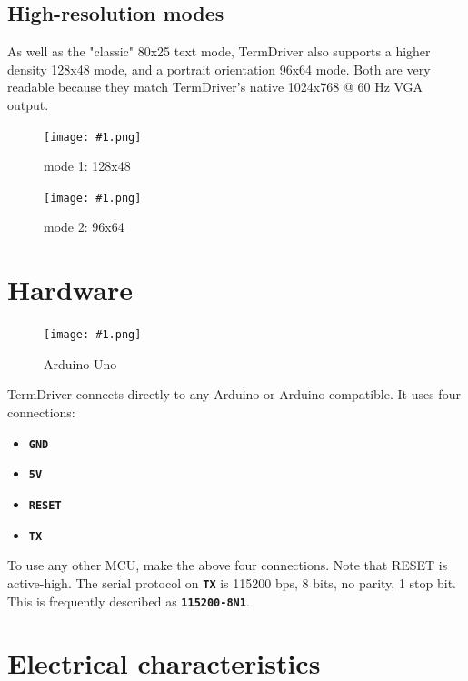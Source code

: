 \documentclass{article}
\newcommand{\png}[2]{
\begin{figure}[H]
\begin{center}
\texttt{[image: \#1.png]}
\caption{#2}
\end{center}
\end{figure}
}
\newcommand{\mach}[1]{\texttt{\textbf{#1}}}
\begin{document}
\subsection{High-resolution modes}

As well as the "classic" 80x25 text mode,
TermDriver also supports a higher density 128x48 mode,
and a portrait orientation 96x64 mode.
Both are very readable because
they match TermDriver's native 1024x768 @ 60 Hz VGA output.

\png{img/moby1}{mode 1: 128x48}
\png{img/moby2}{mode 2: 96x64}

\newpage
\section{Hardware}

\png{img/arduino}{Arduino Uno}

TermDriver connects directly to any Arduino or Arduino-compatible.
It uses four connections:

\begin{itemize}
\item \mach{GND}
\item \mach{5V}
\item \mach{RESET}
\item \mach{TX}
\end{itemize}

\noindent
To use any other MCU, make the above four connections. Note that RESET is active-high.
The serial protocol on \mach{TX} is 115200 bps, 8 bits, no parity, 1 stop bit.
This is frequently described as \mach{115200-8N1}.

\newpage
\hypertarget{technical-specifications}{}
\hypertarget{technical-specifications}{%
\section{Electrical characteristics}\label{electrical-characteristics}}
\end{document}

